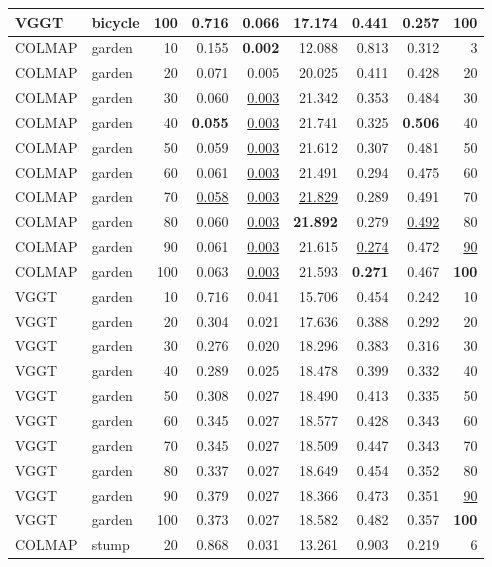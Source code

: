 \begin{table}[H]
\begin{tabular}{llrrrrrrr}
VGGT & bicycle & 100 & 0.716 & 0.066 & 17.174 & 0.441 & 0.257 & \textbf{100} \\
\midrule
COLMAP & garden & 10 & 0.155 & \textbf{0.002} & 12.088 & 0.813 & 0.312 & 3 \\
COLMAP & garden & 20 & 0.071 & 0.005 & 20.025 & 0.411 & 0.428 & 20 \\
COLMAP & garden & 30 & 0.060 & \underline{0.003} & 21.342 & 0.353 & 0.484 & 30 \\
COLMAP & garden & 40 & \textbf{0.055} & \underline{0.003} & 21.741 & 0.325 & \textbf{0.506} & 40 \\
COLMAP & garden & 50 & 0.059 & \underline{0.003} & 21.612 & 0.307 & 0.481 & 50 \\
COLMAP & garden & 60 & 0.061 & \underline{0.003} & 21.491 & 0.294 & 0.475 & 60 \\
COLMAP & garden & 70 & \underline{0.058} & \underline{0.003} & \underline{21.829} & 0.289 & 0.491 & 70 \\
COLMAP & garden & 80 & 0.060 & \underline{0.003} & \textbf{21.892} & 0.279 & \underline{0.492} & 80 \\
COLMAP & garden & 90 & 0.061 & \underline{0.003} & 21.615 & \underline{0.274} & 0.472 & \underline{90} \\
COLMAP & garden & 100 & 0.063 & \underline{0.003} & 21.593 & \textbf{0.271} & 0.467 & \textbf{100} \\
VGGT & garden & 10 & 0.716 & 0.041 & 15.706 & 0.454 & 0.242 & 10 \\
VGGT & garden & 20 & 0.304 & 0.021 & 17.636 & 0.388 & 0.292 & 20 \\
VGGT & garden & 30 & 0.276 & 0.020 & 18.296 & 0.383 & 0.316 & 30 \\
VGGT & garden & 40 & 0.289 & 0.025 & 18.478 & 0.399 & 0.332 & 40 \\
VGGT & garden & 50 & 0.308 & 0.027 & 18.490 & 0.413 & 0.335 & 50 \\
VGGT & garden & 60 & 0.345 & 0.027 & 18.577 & 0.428 & 0.343 & 60 \\
VGGT & garden & 70 & 0.345 & 0.027 & 18.509 & 0.447 & 0.343 & 70 \\
VGGT & garden & 80 & 0.337 & 0.027 & 18.649 & 0.454 & 0.352 & 80 \\
VGGT & garden & 90 & 0.379 & 0.027 & 18.366 & 0.473 & 0.351 & \underline{90} \\
VGGT & garden & 100 & 0.373 & 0.027 & 18.582 & 0.482 & 0.357 & \textbf{100} \\
\midrule
COLMAP & stump & 20 & 0.868 & 0.031 & 13.261 & 0.903 & 0.219 & 6 \\

\end{tabular}
\end{table}
